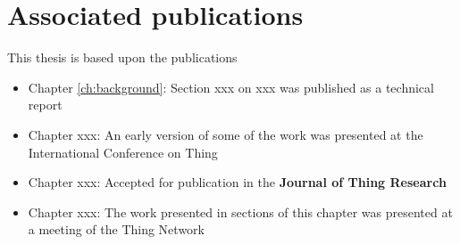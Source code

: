 \clearpage
\section{Associated publications}
\label{sec:publications}

This thesis is based upon the publications

\begin{itemize}

\item	
Chapter \ref{ch:background}:
Section xxx on xxx
was published as a technical report 

\item	
Chapter xxx:
An early version of some of the work was presented at the International Conference on Thing %

\item	
Chapter xxx:
Accepted for publication in the \textbf{Journal of Thing Research}

\item	
Chapter xxx:
The work presented in sections of this chapter was presented at a meeting of the Thing Network

\end{itemize}